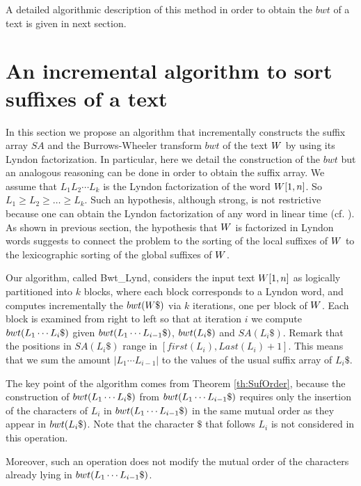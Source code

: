 \documentclass[envcountsame,runningheads]{llncs}
\begin{document}
A detailed algorithmic description of this method in order to obtain the $bwt$ of a text is given in next section.





\section{An incremental algorithm to sort suffixes of a text}\label{sec:algo}

In this section we propose an algorithm that incrementally constructs the suffix array $SA$ and the Burrows-Wheeler transform $bwt$ of the text $W$ by using its Lyndon factorization. In particular, here we detail the construction of the $bwt$ but an analogous reasoning can be done in order to obtain the suffix array.
We assume that $L_1L_2 \cdots L_k$ is the Lyndon factorization of the word $W[1,n]$.
So  $L_1 \geq L_2 \geq \ldots \geq L_k$.
Such an hypothesis, although strong, is not restrictive because one can obtain the Lyndon factorization of any word in linear time (cf. \cite{Duval1983,Lothaire:2005}).
As shown in previous section, the hypothesis that $W$ is factorized in Lyndon words suggests to connect the problem to the sorting of the local suffixes of $W$ to the lexicographic sorting of the global suffixes of $W$.

Our algorithm, called {\sc Bwt\_Lynd}, considers the input text $W[1,n]$ as logically partitioned into $k$ blocks, where each block corresponds to a Lyndon word, and computes incrementally the ${bwt}(W\$)$ via $k$ iterations, one per block of $W$.
Each block is examined from right to left so that at iteration $i$ we compute ${bwt}(L_1 \cdots L_{i}\$)$ given ${bwt}(L_1 \cdots L_{i-1}\$)$, ${bwt}(L_i\$)$ and $SA(L_i\$)$.
Remark that the positions in $SA(L_i\$)$ range in $[first(L_i), Last(L_i)+1]$. This means that we sum the amount $|L_1 \cdots L_{i-1}|$ to the values of the usual suffix array of $L_i\$$.

The key point of the algorithm comes from Theorem \ref{th:SufOrder}, because the construction of ${bwt}(L_1 \cdots L_{i}\$)$ from   ${bwt}(L_1 \cdots L_{i-1}\$)$  requires only the insertion of the characters of $L_{i}$ in ${bwt}(L_1 \cdots L_{i-1}\$)$ in the same mutual order as they appear in ${bwt}(L_i\$)$. Note that the character $\$$ that follows $L_i$ is not considered in this operation.

Moreover, such an operation does not modify the mutual order of the characters already lying in ${bwt}(L_1 \cdots L_{i-1}\$)$.
\end{document}
